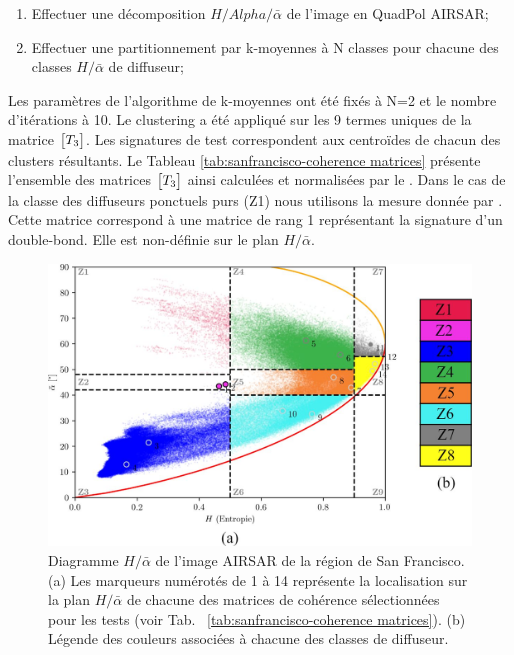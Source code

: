 \begin{enumerate}
    \item Effectuer une décomposition $H/Alpha/\bar{\alpha}$ de l'image en QuadPol AIRSAR;
    \item Effectuer une partitionnement par k-moyennes à N classes pour chacune des classes $H/\bar{\alpha}$ de diffuseur;
\end{enumerate}

Les paramètres de l'algorithme de k-moyennes ont été fixés à N=2 et le nombre d'itérations à 10. Le clustering a été appliqué sur les 9 termes uniques de la matrice $\begin{bmatrix} T_3 \end{bmatrix}$. Les signatures de test correspondent aux centroïdes de chacun des clusters résultants. Le Tableau \ref{tab:sanfrancisco-coherence matrices} présente l'ensemble des matrices $\begin{bmatrix} T_3 \end{bmatrix}$ ainsi calculées et normalisées par le \itspanns. Dans le cas de la classe des diffuseurs ponctuels purs (Z1) nous utilisons la mesure donnée par \cite{Foucher2014}. Cette matrice correspond à une matrice de rang 1 représentant la signature d'un double-bond. Elle est non-définie sur le plan $H/\bar{\alpha}$.

\begin{figure}
  \includegraphics[width=0.90\linewidth]{figures/Chap3/halpha_sanfrancisco_diagram.jpg}
  \centering
  \caption{
  \small{
  Diagramme $H/\bar{\alpha}$ de l'image AIRSAR de la région de San Francisco. (a) Les marqueurs numérotés de 1 à 14 représente la localisation sur la plan $H/\bar{\alpha}$ de chacune des matrices de cohérence sélectionnées pour les tests (voir Tab. ~\ref{tab:sanfrancisco-coherence matrices}). (b) Légende des couleurs associées à chacune des classes de diffuseur.
  }
  }
  \label{fig:sanfrancisco-airsar-halpha-diagram}
\end{figure}

